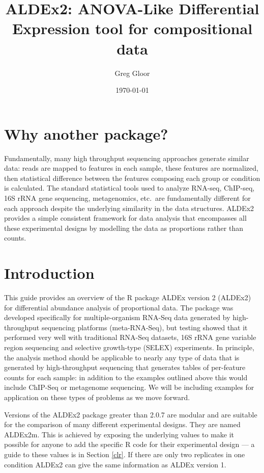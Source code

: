 \documentclass[11pt]{article}
\title{ALDEx2: ANOVA-Like Differential Expression tool for compositional data}
\author{Greg Gloor}
\date{\today}                                           %
\begin{document}
\maketitle
\tableofcontents
\section{Why another package?}
Fundamentally, many high throughput sequencing approaches generate similar data: reads are mapped to features in each sample, these features are normalized, then statistical difference between the features composing each group or condition is calculated.  The standard statistical tools used to analyze RNA-seq, ChIP-seq, 16S rRNA gene sequencing, metagenomics, etc.\ are fundamentally different for each approach  despite the underlying similarity in the data structures. ALDEx2 provides a simple consistent framework for data analysis that encompasses all these experimental designs by modelling the data as proportions rather than counts.

\section{Introduction}
This guide provides an overview of the R package ALDEx version 2 (ALDEx2) for differential abundance analysis of proportional data. The package was developed specifically for multiple-organism RNA-Seq data generated by high-throughput sequencing platforms (meta-RNA-Seq)\cite{macklaim:2013}, but testing showed that it performed very well with traditional RNA-Seq datasets, 16S rRNA gene variable region sequencing and selective growth-type (SELEX) experiments\cite{fernandes:2013,fernandes:2014}. In principle, the analysis method should be applicable to nearly any type of data that is generated by high-throughput sequencing that generates tables of per-feature counts for each sample: in addition to the examples outlined above this would include  ChIP-Seq or metagenome sequencing. We will be including examples for application on these types of problems as we move forward.

Versions of the ALDEx2 package greater than 2.0.7 are modular and are suitable for the comparison of many different experimental designs. They are named ALDEx2m. This is achieved by exposing the underlying values to make it possible for anyone to add the specific R code for their experimental design --- a guide to these values is in Section \ref{clr}. If there are only two replicates in one condition ALDEx2 can give the same information as ALDEx version 1. 
\end{document}

